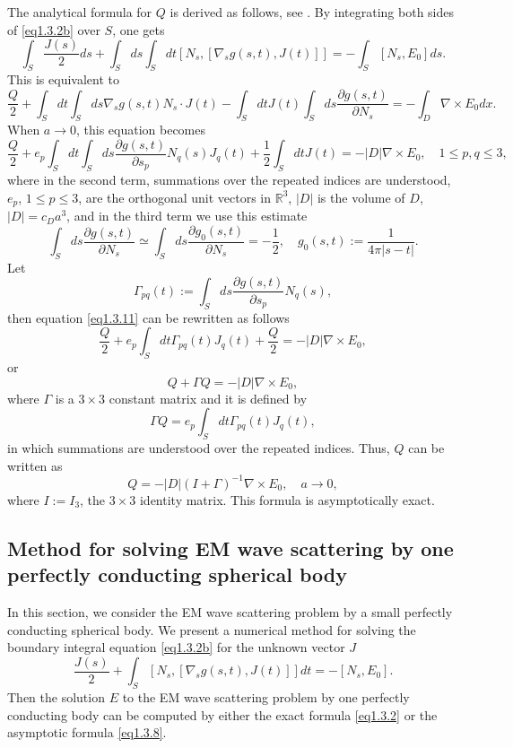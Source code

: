 \documentclass[12pt]{article}
\numberwithin{equation}{section}
\newcommand{\be}{\begin{equation}}
\newcommand{\ee}{\end{equation}}
\newcommand{\RRR}{\mathbb{R}^3}
\begin{document}
The analytical formula for $Q$ is derived as follows, see \cite{R652}. By integrating both sides of \eqref{eq1.3.2b} over $S$, one gets
\be \label{eq1.3.9}
    \int_S \frac{J(s)}{2}ds +\int_S ds \int_S dt [N_s,[\nabla_s g(s,t),J(t)]]=-\int_S [N_s,E_0]ds.
\ee
This is equivalent to
\be \label{eq1.3.10}
    \frac{Q}{2}+\int_S dt \int_S ds \nabla_s g(s,t)N_s\cdot J(t)-\int_S dt J(t) \int_S ds \frac{\partial g(s,t)}{\partial N_s}=-\int_D \nabla\times E_0 dx.
\ee
When $a\to 0$, this equation becomes
\be \label{eq1.3.11}
    \frac{Q}{2}+e_p\int_S dt \int_S ds \frac{\partial g(s,t)}{\partial s_p}N_q(s) J_q(t)+\frac{1}{2}\int_S dt J(t) =-|D| \nabla\times E_0, \quad  1\le p,q\le 3,
\ee
where in the second term, summations over the repeated indices are understood, $e_p$, $1\le p\le 3$, are the orthogonal unit vectors in $\RRR$, $|D|$ is the volume of $D$, $|D|=c_D a^3$, and in the third term we use this estimate
\be \label{eq1.3.12}
    \int_S ds \frac{\partial g(s,t)}{\partial  N_s}\simeq \int_S ds \frac{\partial g_0(s,t)}{\partial  N_s}=-\frac{1}{2}, \quad g_0(s,t):=\frac{1}{4\pi|s-t|}.
\ee
Let
\be \label{eq1.3.13}
    \Gamma_{pq}(t):=\int_S ds \frac{\partial g(s,t)}{\partial  s_p}N_q(s),
\ee
then equation \eqref{eq1.3.11} can be rewritten as follows
\be \label{eq1.3.14}
    \frac{Q}{2}+e_p\int_S dt \Gamma_{pq}(t) J_q(t)+\frac{Q}{2}=-|D| \nabla\times E_0,
\ee
or
\be \label{eq1.3.15}
    Q+\Gamma Q=-|D| \nabla\times E_0,
\ee
where $\Gamma$ is a $3\times 3$ constant matrix and it is defined by
\be \label{eq1.3.16a}
    \Gamma Q=e_p\int_S dt \Gamma_{pq}(t) J_q(t),
\ee
in which summations are understood over the repeated indices. Thus, $Q$ can be written as
\be \label{eq1.3.16}
        Q=-|D|(I+\Gamma)^{-1} \nabla\times E_0, \quad a \to 0,
\ee
where $I:=I_3$, the $3\times 3$ identity matrix. This formula is asymptotically exact.

\subsection{Method for solving EM wave scattering by one perfectly conducting spherical body}\label{sec3.1}
In this section, we consider the EM wave scattering problem by a small perfectly conducting spherical body. We present a numerical method for solving the boundary integral equation \eqref{eq1.3.2b} for the unknown vector $J$
\be \label{eq3.0.1}
    \frac{J(s)}{2}+\int_S [N_s,[\nabla_s g(s,t),J(t)]]dt=-[N_s,E_0].
\ee
Then the solution $E$ to the EM wave scattering problem by one perfectly conducting body can be computed by
either the exact formula \eqref{eq1.3.2} or the asymptotic formula \eqref{eq1.3.8}.
\end{document}
